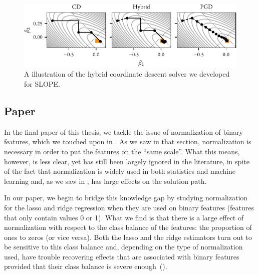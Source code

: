 \begin{figure}[htpb]
  \centering
  \includegraphics[]{figures/illustration_solvers_thesis.pdf}
  \caption{%
    A illustration of the hybrid coordinate descent solver we developed for SLOPE.
  }
  \label{fig:paper5-highlight}
\end{figure}

\subsection{Paper \VI}

In the final paper of this thesis, we tackle the issue of normalization of binary features, which we touched upon in . As we saw in that section, normalization is necessary in order to put the features on the ``same scale''. What this means, however, is less clear, yet has still been largely ignored in the literature, in spite of the fact that normalization is widely used in both statistics and machine learning and, as we saw in , has large effects on the solution path.

In our paper, we begin to bridge this knowledge gap by studying normalization for the lasso and ridge regression when they are used on binary features (features that only contain values 0 or 1). What we find is that there is a large effect of normalization with respect to the class balance of the features: the proportion of ones to zeros (or vice versa). Both the lasso and the ridge estimators turn out to be sensitive to this class balance and, depending on the type of normalization used, have trouble recovering effects that are associated with binary features provided that their class balance is severe enough~().

